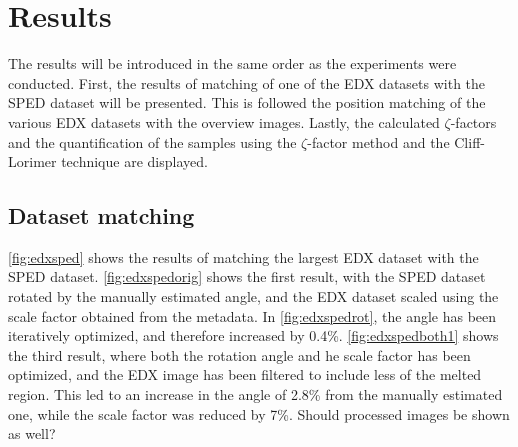 \chapter{Results}

The results will be introduced in the same order as the experiments were conducted. First, the results of matching of one of the EDX datasets with the SPED dataset will be presented. This is followed the position matching of the various EDX datasets with the overview images. Lastly, the calculated $\zeta$-factors and the quantification of the samples using the $\zeta$-factor method and the Cliff-Lorimer technique are displayed.

\section{Dataset matching}

\cref{fig:edxsped} shows the results of matching the largest EDX dataset with the SPED dataset. \cref{fig:edxspedorig} shows the first result, with the SPED dataset rotated by the manually estimated angle, and the EDX dataset scaled using the scale factor obtained from the metadata. In \cref{fig:edxspedrot}, the angle has been iteratively optimized, and therefore increased by 0.4\%. \cref{fig:edxspedboth1} shows the third result, where both the rotation angle and he scale factor has been optimized, and the EDX image has been filtered to include less of the melted region. This led to an increase in the angle of 2.8\% from the manually estimated one, while the scale factor was reduced by 7\%. Should processed images be shown as well?%


